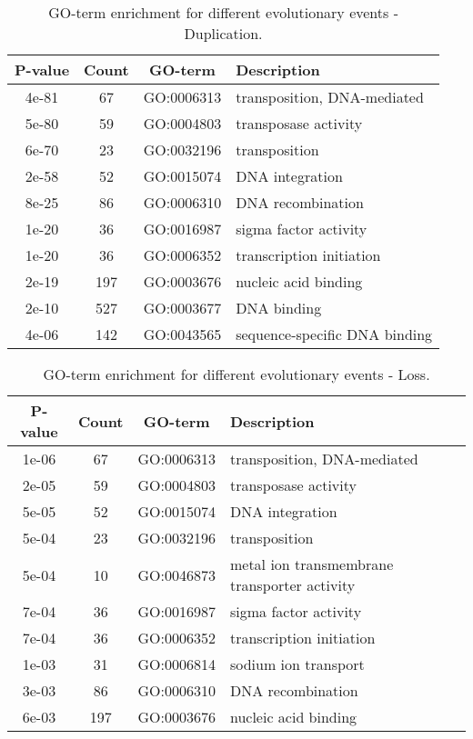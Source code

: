 \documentclass[english]{article}
\begin{document}
%
\begin{table}
\caption{\label{tab:go-events-duplication}GO-term enrichment for different
evolutionary events - Duplication.}
\begin{tabular}{cccl}
\hline 
P-value & Count & GO-term & Description \\
\hline 
4e-81 &  67 & GO:0006313 & transposition, DNA-mediated\\
5e-80 &  59 & GO:0004803 & transposase activity\\
6e-70 &  23 & GO:0032196 & transposition\\
2e-58 &  52 & GO:0015074 & DNA integration\\
8e-25 &  86 & GO:0006310 & DNA recombination\\
1e-20 &  36 & GO:0016987 & sigma factor activity\\
1e-20 &  36 & GO:0006352 & transcription initiation\\
2e-19 & 197 & GO:0003676 & nucleic acid binding\\
2e-10 & 527 & GO:0003677 & DNA binding\\
4e-06 & 142 & GO:0043565 & sequence-specific DNA binding\\
\hline 
\end{tabular}
\end{table}
\clearpage{}

%
\begin{table}
\caption{\label{tab:go-events-loss}GO-term enrichment for different
evolutionary events - Loss.}
\begin{tabular}{cccl}
\hline 
P-value & Count & GO-term & Description \\
\hline 
1e-06 &  67 & GO:0006313 & transposition, DNA-mediated\\
2e-05 &  59 & GO:0004803 & transposase activity\\
5e-05 &  52 & GO:0015074 & DNA integration\\
5e-04 &  23 & GO:0032196 & transposition\\
5e-04 &  10 & GO:0046873 & metal ion transmembrane transporter activity\\
7e-04 &  36 & GO:0016987 & sigma factor activity\\
7e-04 &  36 & GO:0006352 & transcription initiation\\
1e-03 &  31 & GO:0006814 & sodium ion transport\\
3e-03 &  86 & GO:0006310 & DNA recombination\\
6e-03 & 197 & GO:0003676 & nucleic acid binding\\
\hline 
\end{tabular}
\end{table}
\clearpage{}
\end{document}
